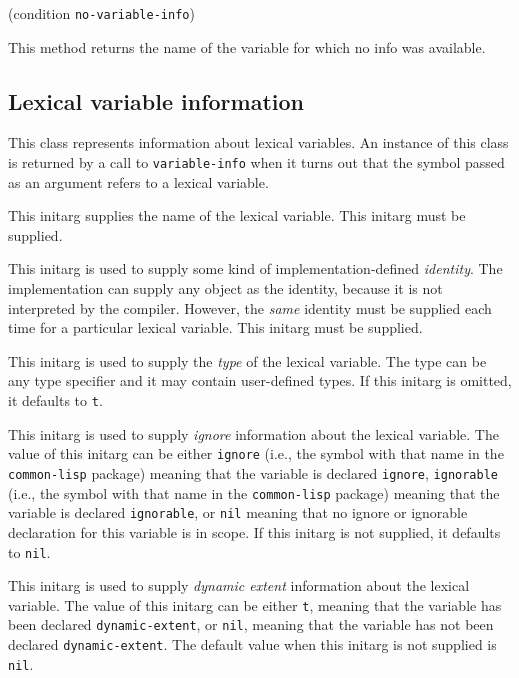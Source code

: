  {(condition {\tt no-variable-info})}

This method returns the name of the variable for which no info was
available. 

\subsection{Lexical variable information}


This class represents information about lexical variables.  An
instance of this class is returned by a call to \texttt{variable-info}
when it turns out that the symbol passed as an argument refers to a
lexical variable.


This initarg supplies the name of the lexical variable.  This initarg
must be supplied. 


This initarg is used to supply some kind of implementation-defined 
\emph{identity}.  The implementation can supply any object as the
identity, because it is not interpreted by the compiler.  However, the
\emph{same} identity must be supplied each time for a particular
lexical variable.  This initarg must be supplied. 


This initarg is used to supply the \emph{type} of the lexical
variable.  The type can be any type specifier and it may contain
user-defined types.  If this initarg is omitted, it defaults to
\texttt{t}. 


This initarg is used to supply \emph{ignore} information about the
lexical variable.  The value of this initarg can be either
\texttt{ignore} (i.e., the symbol with that name in the
\texttt{common-lisp} package) meaning that the variable is declared
\texttt{ignore}, \texttt{ignorable} (i.e., the symbol with that name
in the \texttt{common-lisp} package) meaning that the variable is
declared \texttt{ignorable}, or \texttt{nil} meaning that no ignore or
ignorable declaration for this variable is in scope.  If this initarg
is not supplied, it defaults to \texttt{nil}.


This initarg is used to supply \emph{dynamic extent} information about
the lexical variable.  The value of this initarg can be either
\texttt{t}, meaning that the variable has been declared
\texttt{dynamic-extent}, or \texttt{nil}, meaning that the variable
has not been declared \texttt{dynamic-extent}.  The default value when
this initarg is not supplied is \texttt{nil}. 

